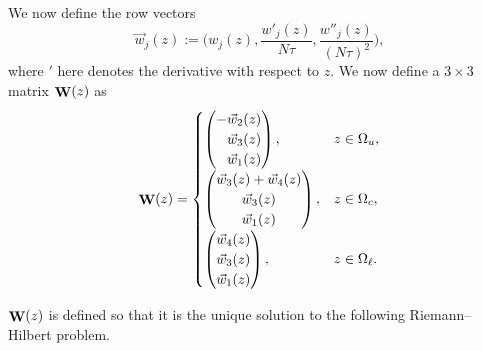 \documentclass[10pt,a4paper]{amsart}
\DeclareMathOperator{\WW}{{\bf W}}
\numberwithin{equation}{section}
\begin{document}
We now define the row vectors
\begin{equation*}
 \vec{w}_j(z) := \biggl(w_j(z), \frac{w'_j(z)}{N\tau},\frac{w''_j(z)}{(N\tau)^2}\biggr),
\end{equation*}
where $'$ here denotes the derivative with respect to $z$.
We now define a $3\times 3$ matrix $\WW(z)$ as
 \begin{equation*}
 \WW(z) =
 \begin{cases}
 \begin{pmatrix}
 -\vec{w}_2(z) \\
 \hphantom{-}\vec{w}_3(z) \\
 \hphantom{-}\vec{w}_1(z)
 \end{pmatrix},& z \in\Omega_u, \\[2.5mm]
 \begin{pmatrix}
 \vec{w}_3(z) + \vec{w}_4(z) \\
 \vec{w}_3(z) \\
 \vec{w}_1(z)
 \end{pmatrix}, & z \in \Omega_c,\\[2.5mm]
 \begin{pmatrix}
 \vec{w}_4(z) \\
 \vec{w}_3(z) \\
 \vec{w}_1(z)
 \end{pmatrix}, & z \in \Omega_{\ell}.
 \end{cases}
 \end{equation*}

$\WW(z)$ is defined so that it is the unique solution to the following Riemann--Hilbert problem.
\end{document}
